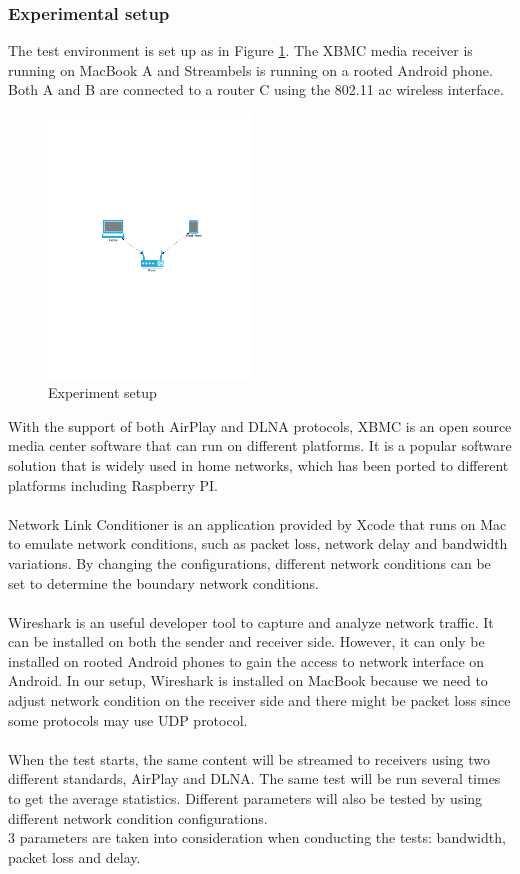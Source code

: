 \subsubsection{Experimental setup}
The test environment is set up as in Figure \ref{setup}. The XBMC
media receiver is running on MacBook A and Streambels is running on a rooted Android phone. Both A and B are connected to a router C using the 802.11 ac wireless interface. \\
\begin{figure}[htb]
\centering \includegraphics[height=7cm]{charts/experiment_setup}
\caption{Experiment setup \label{setup}}
\end{figure}
With the support of both AirPlay and DLNA protocols, XBMC is an open source media center software that can run on different platforms. It is a popular software solution that is widely used in home networks, which has been ported to different platforms including Raspberry PI.\\
\\
Network Link Conditioner is an application provided by Xcode that runs on Mac to emulate network conditions, such as packet loss, network delay and bandwidth variations. By changing the configurations, different network conditions can be set to determine the boundary network conditions.\\
\\
Wireshark is an useful developer tool to capture and analyze network traffic. It can be installed on both the sender and receiver side. However, it can only be installed on rooted Android phones to gain the access to network interface on Android. In our setup, Wireshark is installed on MacBook because we need to adjust network condition on the receiver side and there might be packet loss since some protocols may use UDP protocol.\\
\\
When the test starts, the same content will be streamed to receivers using two different standards, AirPlay and DLNA. The same test will be run several times to get the average statistics. Different parameters will also be tested by using different network condition configurations.
\\
3 parameters are taken into consideration when conducting the tests: bandwidth, packet loss and delay. 
